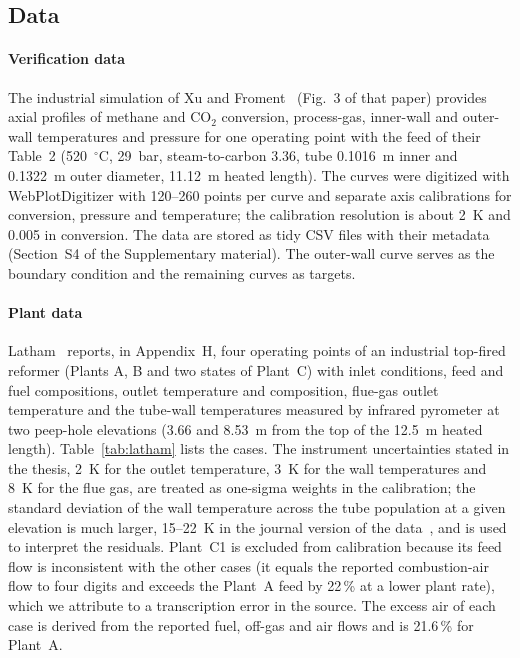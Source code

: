 \documentclass[final,3p,times]{elsarticle}
\begin{document}
\subsection{Data}
\label{sec:data}

\paragraph{Verification data} The industrial simulation of Xu and Froment~\cite{xu1989b} (Fig.~3 of that paper) provides axial profiles of methane and CO$_2$ conversion, process-gas, inner-wall and outer-wall temperatures and pressure for one operating point with the feed of their Table~2 (520~$^\circ$C, 29~bar, steam-to-carbon 3.36, tube 0.1016~m inner and 0.1322~m outer diameter, 11.12~m heated length). The curves were digitized with WebPlotDigitizer with 120--260 points per curve and separate axis calibrations for conversion, pressure and temperature; the calibration resolution is about 2~K and 0.005 in conversion. The data are stored as tidy CSV files with their metadata (Section~S4 of the Supplementary material). The outer-wall curve serves as the boundary condition and the remaining curves as targets.

\paragraph{Plant data} Latham~\cite{latham2008} reports, in Appendix~H, four operating points of an industrial top-fired reformer (Plants A, B and two states of Plant~C) with inlet conditions, feed and fuel compositions, outlet temperature and composition, flue-gas outlet temperature and the tube-wall temperatures measured by infrared pyrometer at two peep-hole elevations (3.66 and 8.53~m from the top of the 12.5~m heated length). Table~\ref{tab:latham} lists the cases. The instrument uncertainties stated in the thesis, 2~K for the outlet temperature, 3~K for the wall temperatures and 8~K for the flue gas, are treated as one-sigma weights in the calibration; the standard deviation of the wall temperature across the tube population at a given elevation is much larger, 15--22~K in the journal version of the data~\cite{latham2011}, and is used to interpret the residuals. Plant~C1 is excluded from calibration because its feed flow is inconsistent with the other cases (it equals the reported combustion-air flow to four digits and exceeds the Plant~A feed by 22\,\% at a lower plant rate), which we attribute to a transcription error in the source. The excess air of each case is derived from the reported fuel, off-gas and air flows and is 21.6\,\% for Plant~A.
\end{document}
